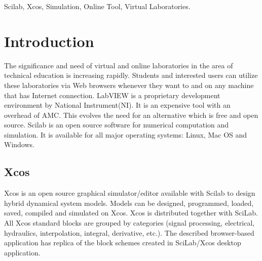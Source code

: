\documentclass[conference]{IEEEtran}
\begin{document}
\begin{IEEEkeywords}
Scilab, Xcos, Simulation, Online Tool, Virtual Laboratories.
\end{IEEEkeywords}






%
\IEEEpeerreviewmaketitle



\section{Introduction}
The significance and need of virtual and online laboratories in the area of technical education is increasing rapidly. Students
and interested users can utilize these laboratories via Web browsers whenever they want to and on any machine that has Internet connection.
LabVIEW is a proprietary development environment by National Instrument(NI). It is an expensive tool with an overhead of AMC. This evolves the need for an alternative which is free and open source. Scilab is an open source software for numerical computation and simulation. It is available for all major operating systems: Linux, Mac OS and Windows.
\subsection{Xcos}
Xcos is an open source graphical simulator/editor available with Scilab to design hybrid dynamical system models. Models can be designed, programmed, loaded, saved, compiled and simulated on Xcos. Xcos is distributed together with SciLab. All Xcos standard blocks are grouped by categories (signal processing, electrical, hydraulics, interpolation, integral, derivative, etc.). The described browser-based application has replica of the block schemes created in SciLab/Xcos desktop application.
\end{document}
